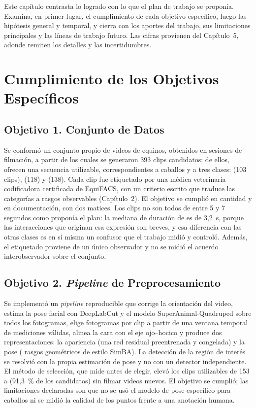 
Este capítulo contrasta lo logrado con lo que el plan de trabajo se proponía. Examina, en primer lugar, el cumplimiento de cada objetivo específico, luego las hipótesis general y temporal, y cierra con los aportes del trabajo, sus limitaciones principales y las líneas de trabajo futuro. Las cifras provienen del Capítulo~5, adonde remiten los detalles y las incertidumbres.

\section{Cumplimiento de los Objetivos Específicos}
\subsection{Objetivo 1. Conjunto de Datos}
Se conformó un conjunto propio de \VideosTotal{} videos de equinos, obtenidos en \SesionesTotal{} sesiones de filmación, a partir de los cuales se generaron 393 clips candidatos; de ellos, \ClipsTotal{} ofrecen una secuencia utilizable, correspondientes a \CaballosTotal{} caballos y a tres clases:  (103 clips),  (118) y  (138). Cada clip fue etiquetado por una médica veterinaria codificadora certificada de EquiFACS, con un criterio escrito que traduce las categorías a rasgos observables (Capítulo~2). El objetivo se cumplió en cantidad y en documentación, con dos matices. Los clips no son todos de entre 5 y 7 segundos como proponía el plan: la mediana de duración de  es de 3,2~s, porque las interacciones que originan esa expresión son breves, y esa diferencia con las otras clases es en sí misma un confusor que el trabajo midió y controló. Además, el etiquetado proviene de un único observador y no se midió el acuerdo interobservador sobre el conjunto.

\subsection{Objetivo 2. \textit{Pipeline} de Preprocesamiento}
Se implementó un \textit{pipeline} reproducible que corrige la orientación del video, estima la pose facial con DeepLabCut y el modelo SuperAnimal-Quadruped sobre todos los fotogramas, elige \Fotogramas{} fotogramas por clip a partir de una ventana temporal de mediciones válidas, alinea la cara con el eje ojo--hocico y produce dos representaciones: la apariencia (una red residual preentrenada y congelada) y la pose (\PoseRasgos{} rasgos geométricos de estilo SimBA). La detección de la región de interés se resolvió con la propia estimación de pose y no con un detector independiente. El método de selección, que mide antes de elegir, elevó los clips utilizables de 153 a \ClipsTotal{} (91,3~\% de los candidatos) sin filmar videos nuevos. El objetivo se cumplió; las limitaciones declaradas son que no se usó el modelo de pose específico para caballos ni se midió la calidad de los puntos frente a una anotación humana.


